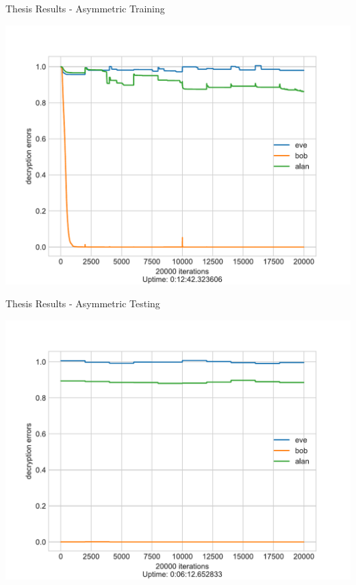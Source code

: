 \documentclass{beamer}
\begin{document}
		\begin{frame}{Thesis Results - Asymmetric Training}
			\begin{center}
				\includegraphics[height=0.9\textheight]{neurencoder-asymmetric-training}
			\end{center}
		\end{frame}
		\begin{frame}{Thesis Results - Asymmetric Testing}
			\begin{center}
				\includegraphics[height=0.9\textheight]{neurencoder-asymmetric-testing}
			\end{center}
		\end{frame}
\end{document}
